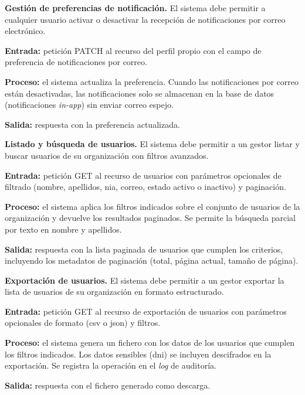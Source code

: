 \begin{functional}
    \item \textbf{Gestión de preferencias de notificación.} \label{rf:users:notif_prefs}
    El sistema debe permitir a cualquier usuario activar o desactivar la recepción de
    notificaciones por correo electrónico.

    \textbf{Entrada:} petición PATCH al recurso del perfil propio con el campo de
    preferencia de notificaciones por correo.

    \textbf{Proceso:} el sistema actualiza la preferencia. Cuando las notificaciones por
    correo están desactivadas, las notificaciones solo se almacenan en la base de datos
    (notificaciones \textit{in-app}) sin enviar correo espejo.

    \textbf{Salida:} respuesta con la preferencia actualizada.

    \item \textbf{Listado y búsqueda de usuarios.} \label{rf:users:list}
    El sistema debe permitir a un gestor listar y buscar usuarios de su organización con
    filtros avanzados.

    \textbf{Entrada:} petición GET al recurso de usuarios con parámetros opcionales de
    filtrado (nombre, apellidos, \acs{nia}, correo, estado activo o inactivo) y paginación.

    \textbf{Proceso:} el sistema aplica los filtros indicados sobre el conjunto de usuarios
    de la organización y devuelve los resultados paginados. Se permite la búsqueda parcial
    por texto en nombre y apellidos.

    \textbf{Salida:} respuesta con la lista paginada de usuarios que cumplen los criterios,
    incluyendo los metadatos de paginación (total, página actual, tamaño de página).

    \item \textbf{Exportación de usuarios.} \label{rf:users:export}
    El sistema debe permitir a un gestor exportar la lista de usuarios de su organización
    en formato estructurado.

    \textbf{Entrada:} petición GET al recurso de exportación de usuarios con parámetros
    opcionales de formato (\acs{csv} o \acs{json}) y filtros.

    \textbf{Proceso:} el sistema genera un fichero con los datos de los usuarios que cumplen
    los filtros indicados. Los datos sensibles (\acs{dni}) se incluyen descifrados en la
    exportación. Se registra la operación en el \textit{log} de auditoría.

    \textbf{Salida:} respuesta con el fichero generado como descarga.

\end{functional}
